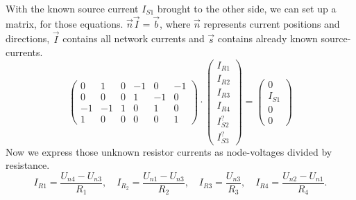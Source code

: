 \documentclass[a4paper]{article}
\begin{document}
{With the known source current $I_{S1}$ brought to the other side, we can set up a matrix, for those
equations. $\vec{n}\vec{I} = \vec{b}$, where $\vec{n}$ represents current positions and directions,
$\vec{I}$ contains all network currents and  $\vec{s}$ contains already known source-currents.
\begin{equation}
   \begin{pmatrix}
      0 & 1 & 0 & -1 & 0 & -1 \\
      0 & 0 & 0 & 1 & -1 & 0  \\
      -1 & -1 & 1 & 0 & 1 & 0 \\
      1 & 0 & 0 & 0 & 0 & 1  
   \end{pmatrix}
   \cdot
   \begin{pmatrix}
       I_{R1} \\ I_{R2} \\ I_{R3} \\ I_{R4} \\ I_{S2}^? \\ I_{S3}^? 
   \end{pmatrix}
   =
   \begin{pmatrix}
      0 \\ I_{S1} \\ 0 \\ 0  
   \end{pmatrix}
   \label{eqn:nodes}
\end{equation}
Now we express those unknown resistor currents as node-voltages divided by resistance.
\[
   I_{R1} = \frac{U_{n4} - U_{n3}}{R_1}, \quad I_{R_2} = \frac{U_{n1} - U_{n3}}{R_2}, \quad
   I_{R3} = \frac{U_{n3}}{R_3}, \quad I_{R4} = \frac{U_{n2} - U_{n1}}{R_4}
.\]

\newpage

}
\end{document}
